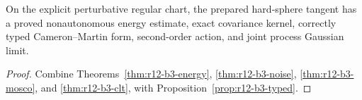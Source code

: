 \begin{theorem}
\label{thm:r12-b3-main}
On the explicit perturbative regular chart, the prepared hard-sphere tangent
has a proved nonautonomous energy estimate, exact covariance kernel, correctly
typed Cameron--Martin form, second-order action, and joint process Gaussian
limit.
\end{theorem}

\begin{proof}
Combine Theorems~\ref{thm:r12-b3-energy},
\ref{thm:r12-b3-noise}, \ref{thm:r12-b3-mosco}, and
\ref{thm:r12-b3-clt}, with Proposition~\ref{prop:r12-b3-typed}.
\end{proof}
